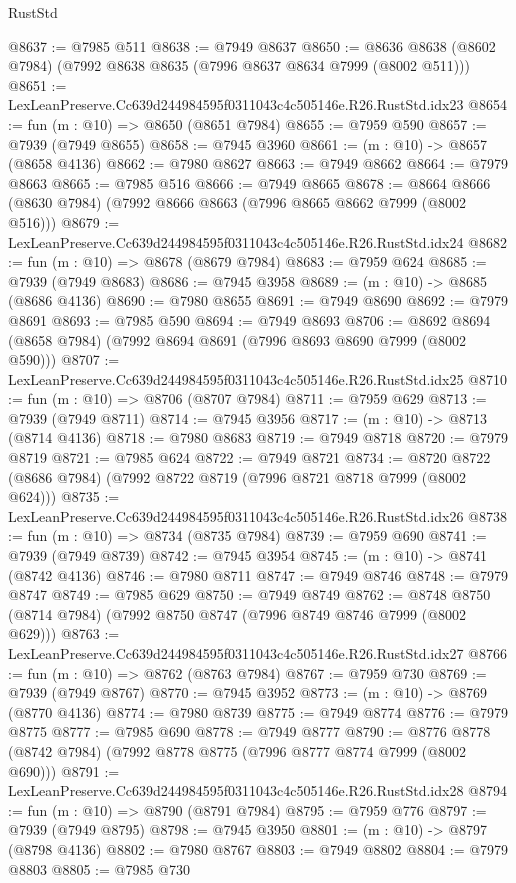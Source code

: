 \begin{lexlean}{RustStd}
\begin{coremodule}
@8637 := @7985 @511
@8638 := @7949 @8637
@8650 := @8636 @8638 (@8602 @7984) (@7992 @8638 @8635 (@7996 @8637 @8634 @7999 (@8002 @511)))
@8651 := LexLeanPreserve.Cc639d244984595f0311043c4c505146e.R26.RustStd.idx23
@8654 := fun (m : @10) => @8650 (@8651 @7984)
@8655 := @7959 @590
@8657 := @7939 (@7949 @8655)
@8658 := @7945 @3960
@8661 := (m : @10) -> @8657 (@8658 @4136)
@8662 := @7980 @8627
@8663 := @7949 @8662
@8664 := @7979 @8663
@8665 := @7985 @516
@8666 := @7949 @8665
@8678 := @8664 @8666 (@8630 @7984) (@7992 @8666 @8663 (@7996 @8665 @8662 @7999 (@8002 @516)))
@8679 := LexLeanPreserve.Cc639d244984595f0311043c4c505146e.R26.RustStd.idx24
@8682 := fun (m : @10) => @8678 (@8679 @7984)
@8683 := @7959 @624
@8685 := @7939 (@7949 @8683)
@8686 := @7945 @3958
@8689 := (m : @10) -> @8685 (@8686 @4136)
@8690 := @7980 @8655
@8691 := @7949 @8690
@8692 := @7979 @8691
@8693 := @7985 @590
@8694 := @7949 @8693
@8706 := @8692 @8694 (@8658 @7984) (@7992 @8694 @8691 (@7996 @8693 @8690 @7999 (@8002 @590)))
@8707 := LexLeanPreserve.Cc639d244984595f0311043c4c505146e.R26.RustStd.idx25
@8710 := fun (m : @10) => @8706 (@8707 @7984)
@8711 := @7959 @629
@8713 := @7939 (@7949 @8711)
@8714 := @7945 @3956
@8717 := (m : @10) -> @8713 (@8714 @4136)
@8718 := @7980 @8683
@8719 := @7949 @8718
@8720 := @7979 @8719
@8721 := @7985 @624
@8722 := @7949 @8721
@8734 := @8720 @8722 (@8686 @7984) (@7992 @8722 @8719 (@7996 @8721 @8718 @7999 (@8002 @624)))
@8735 := LexLeanPreserve.Cc639d244984595f0311043c4c505146e.R26.RustStd.idx26
@8738 := fun (m : @10) => @8734 (@8735 @7984)
@8739 := @7959 @690
@8741 := @7939 (@7949 @8739)
@8742 := @7945 @3954
@8745 := (m : @10) -> @8741 (@8742 @4136)
@8746 := @7980 @8711
@8747 := @7949 @8746
@8748 := @7979 @8747
@8749 := @7985 @629
@8750 := @7949 @8749
@8762 := @8748 @8750 (@8714 @7984) (@7992 @8750 @8747 (@7996 @8749 @8746 @7999 (@8002 @629)))
@8763 := LexLeanPreserve.Cc639d244984595f0311043c4c505146e.R26.RustStd.idx27
@8766 := fun (m : @10) => @8762 (@8763 @7984)
@8767 := @7959 @730
@8769 := @7939 (@7949 @8767)
@8770 := @7945 @3952
@8773 := (m : @10) -> @8769 (@8770 @4136)
@8774 := @7980 @8739
@8775 := @7949 @8774
@8776 := @7979 @8775
@8777 := @7985 @690
@8778 := @7949 @8777
@8790 := @8776 @8778 (@8742 @7984) (@7992 @8778 @8775 (@7996 @8777 @8774 @7999 (@8002 @690)))
@8791 := LexLeanPreserve.Cc639d244984595f0311043c4c505146e.R26.RustStd.idx28
@8794 := fun (m : @10) => @8790 (@8791 @7984)
@8795 := @7959 @776
@8797 := @7939 (@7949 @8795)
@8798 := @7945 @3950
@8801 := (m : @10) -> @8797 (@8798 @4136)
@8802 := @7980 @8767
@8803 := @7949 @8802
@8804 := @7979 @8803
@8805 := @7985 @730

\end{coremodule}
\end{lexlean}
